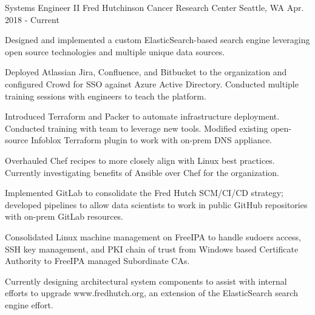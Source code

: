 


\begin{cventries}

\cventry
{Systems Engineer II} %
{Fred Hutchinson Cancer Research Center} %
{Seattle, WA} %
{Apr. 2018 - Current} %
{ %
\begin{cvitems}
\item {Designed and implemented a custom ElasticSearch-based search engine leveraging open source technologies and multiple unique data sources.}
\item {Deployed Atlassian Jira, Confluence, and Bitbucket to the organization and configured Crowd for SSO against Azure Active Directory. Conducted multiple training sessions with engineers to teach the platform.}
\item {Introduced Terraform and Packer to automate infrastructure deployment. Conducted training with team to leverage new tools. Modified existing open-source Infoblox Terraform plugin to work with on-prem DNS appliance.}
\item {Overhauled Chef recipes to more closely align with Linux best practices. Currently investigating benefits of Ansible over Chef for the organization.}
\item {Implemented GitLab to consolidate the Fred Hutch SCM/CI/CD strategy; developed pipelines to allow data scientists to work in public GitHub repositories with on-prem GitLab resources.}
\item {Consolidated Linux machine management on FreeIPA to handle sudoers access, SSH key management, and PKI chain of trust from Windows based Certificate Authority to FreeIPA managed Subordinate CAs. }
\item {Currently designing architectural system components to assist with internal efforts to upgrade www.fredhutch.org, an extension of the ElasticSearch search engine effort.}
\end{cvitems}
}


\end{cventries}
